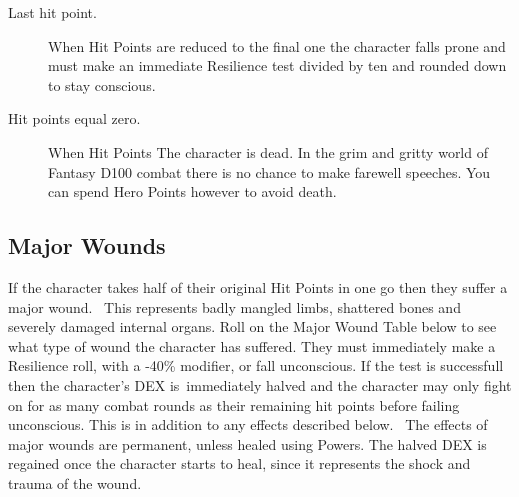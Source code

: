 \begin{description}
	\item[Last hit point.] When Hit Points are reduced to the final one the character falls prone and must make an immediate Resilience test divided by ten and rounded down to stay conscious.
	\item[Hit points equal zero.] When Hit Points The character is dead. In the grim and gritty world of Fantasy D100 combat there is no chance to make farewell speeches. You can spend Hero Points however to avoid death.
\end{description}


\subsection{Major Wounds}
If the character takes half of their original Hit Points in one go then they suffer a major wound.  This represents badly mangled limbs, shattered bones and severely damaged internal organs. Roll on the Major Wound Table below to see what type of wound the character has suffered. They must immediately make a Resilience roll, with a -40\% modifier, or fall unconscious. If the test is successfull then the character’s DEX is immediately halved and the character may only fight on for as many combat rounds as their remaining hit points before failing unconscious. This is in addition to any effects described below.  The effects of major wounds are permanent, unless healed using Powers. The halved DEX is regained once the character starts to heal, since it represents the shock and trauma of the wound.

